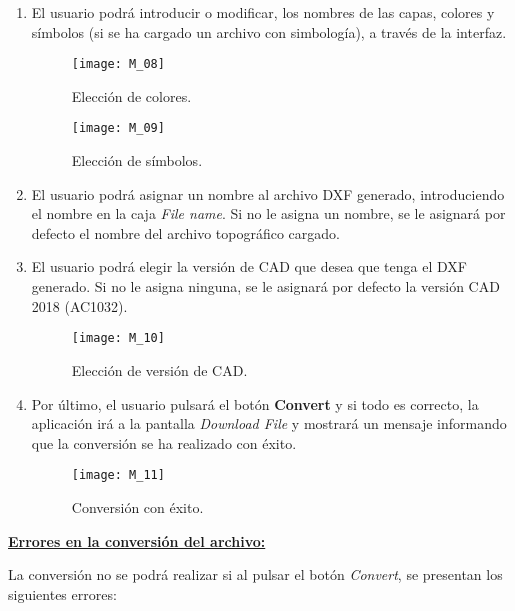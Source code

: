 \begin{enumerate}


\item El usuario podrá introducir o modificar, los nombres de las capas, colores y símbolos (si se ha cargado un archivo con simbología), a través de la interfaz. 
\begin{figure}[H]
	\centering
	\texttt{[image: M\_08]}
	\caption{Elección de colores.}
	\label{fig:M_08}
\end{figure}

\begin{figure}[H]
	\centering
	\texttt{[image: M\_09]}
	\caption{Elección de símbolos.}
	\label{fig:M_09}
\end{figure}

\item El usuario podrá asignar un nombre al archivo DXF generado, introduciendo el nombre en la caja \emph{File name}. Si no le asigna un nombre, se le asignará por defecto el nombre del archivo topográfico cargado.


\item El usuario podrá elegir la versión de CAD que desea que tenga el DXF generado. Si no le asigna ninguna, se le asignará por defecto la versión CAD 2018 (AC1032).

\begin{figure}[H]
	\centering
	\texttt{[image: M\_10]}
	\caption{Elección de versión de CAD.}
	\label{fig:M_10}
\end{figure}

\item Por último, el usuario pulsará el botón \textbf{Convert} y si todo es correcto, la aplicación irá a la pantalla \emph{Download File} y mostrará un mensaje informando que la conversión se ha realizado con éxito.

\begin{figure}[H]
	\centering
	\texttt{[image: M\_11]}
	\caption{Conversión con éxito.}
	\label{fig:M_11}
\end{figure}

\end{enumerate} 

\textbf{\underline{Errores en la conversión del archivo:} } 

La conversión no se podrá realizar si al pulsar el botón \emph{Convert}, se presentan los siguientes errores:

